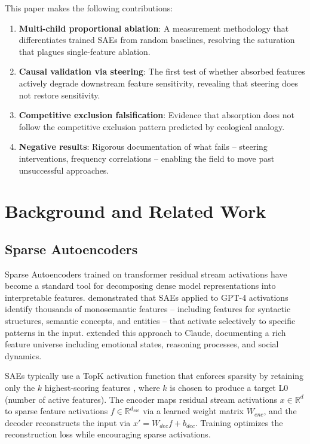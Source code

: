 \documentclass{article}
\begin{document}
This paper makes the following contributions:

\begin{enumerate}
\item \textbf{Multi-child proportional ablation}: A measurement methodology that differentiates trained SAEs from random baselines, resolving the saturation that plagues single-feature ablation.

\item \textbf{Causal validation via steering}: The first test of whether absorbed features actively degrade downstream feature sensitivity, revealing that steering does not restore sensitivity.

\item \textbf{Competitive exclusion falsification}: Evidence that absorption does not follow the competitive exclusion pattern predicted by ecological analogy.

\item \textbf{Negative results}: Rigorous documentation of what fails -- steering interventions, frequency correlations -- enabling the field to move past unsuccessful approaches.
\end{enumerate}


\section{Background and Related Work}

\subsection{Sparse Autoencoders}

Sparse Autoencoders trained on transformer residual stream activations have become a standard tool for decomposing dense model representations into interpretable features. \citet{bricken2023} demonstrated that SAEs applied to GPT-4 activations identify thousands of monosemantic features -- including features for syntactic structures, semantic concepts, and entities -- that activate selectively to specific patterns in the input. \citet{templeton2024} extended this approach to Claude, documenting a rich feature universe including emotional states, reasoning processes, and social dynamics.

SAEs typically use a TopK activation function that enforces sparsity by retaining only the $k$ highest-scoring features \citep{huber1962}, where $k$ is chosen to produce a target L0 (number of active features). The encoder maps residual stream activations $x \in \mathbb{R}^d$ to sparse feature activations $f \in \mathbb{R}^{d_{sae}}$ via a learned weight matrix $W_{enc}$, and the decoder reconstructs the input via $x' = W_{dec} f + b_{dec}$. Training optimizes the reconstruction loss while encouraging sparse activations.
\end{document}
